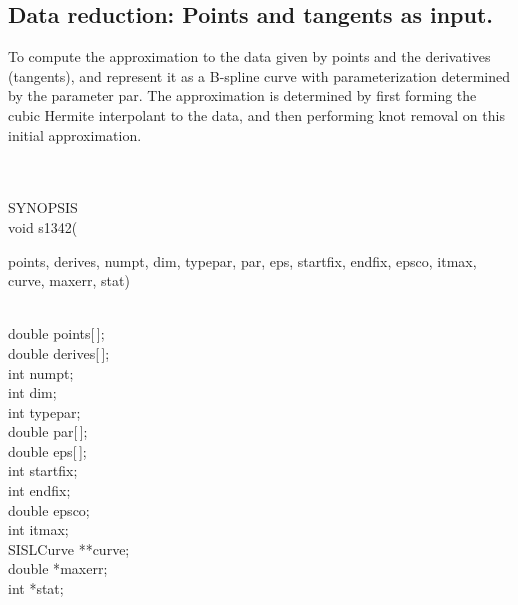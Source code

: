 \subsection{Data reduction: Points and tangents as input.}
\begin{minipg1}
  To compute the approximation to the data given by points and the
  derivatives (tangents), and represent it as a B-spline curve with
  parameterization determined by the parameter par. The approximation is
  determined by first forming the cubic Hermite interpolant to the data, and then
  performing knot removal on this initial approximation.
\end{minipg1} \\ \\
SYNOPSIS\\
        \>void s1342(\begin{minipg3}
        {\fov points}, {\fov derives}, {\fov numpt}, {\fov dim}, {\fov typepar}, {\fov par}, {\fov eps}, {\fov startfix}, {\fov endfix}, {\fov epsco},
        {\fov itmax}, {\fov curve}, {\fov maxerr}, {\fov stat})
                \end{minipg3}\\[0.3ex]
                \>\>    double  \>      {\fov points}[\,];\\
                \>\>    double  \>      {\fov derives}[\,];\\
                \>\>    int     \>      {\fov numpt};\\
                \>\>    int     \>      {\fov dim};\\
                \>\>    int     \>      {\fov typepar};\\
                \>\>    double  \>      {\fov par}[\,];\\
                \>\>    double  \>      {\fov eps}[\,];\\
                \>\>    int     \>      {\fov startfix};\\
                \>\>    int     \>      {\fov endfix};\\
                \>\>    double  \>      {\fov epsco};\\
                \>\>    int     \>      {\fov itmax};\\
                \>\>    SISLCurve       \>      **{\fov curve};\\
                \>\>    double  \>      *{\fov maxerr};\\
                \>\>    int     \>      *{\fov stat};\\
